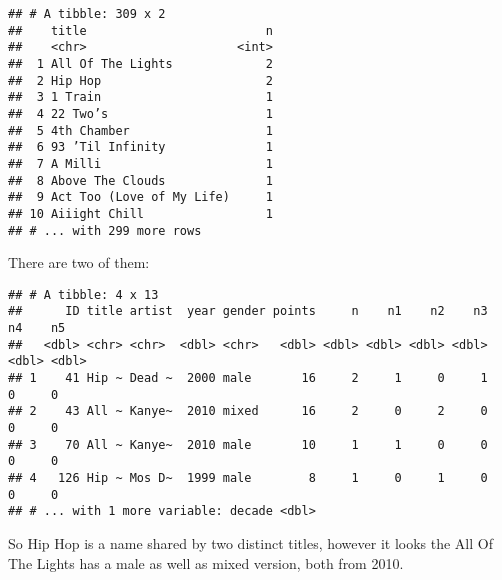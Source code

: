 \documentclass[
]{article}
\newenvironment{Shaded}{\begin{snugshade}}{\end{snugshade}}
\newcommand{\DataTypeTok}[1]{\textcolor[rgb]{0.13,0.29,0.53}{#1}}
\newcommand{\KeywordTok}[1]{\textcolor[rgb]{0.13,0.29,0.53}{\textbf{#1}}}
\newcommand{\NormalTok}[1]{#1}
\newcommand{\OperatorTok}[1]{\textcolor[rgb]{0.81,0.36,0.00}{\textbf{#1}}}
\newcommand{\StringTok}[1]{\textcolor[rgb]{0.31,0.60,0.02}{#1}}
\begin{document}
\begin{verbatim}
## # A tibble: 309 x 2
##    title                         n
##    <chr>                     <int>
##  1 All Of The Lights             2
##  2 Hip Hop                       2
##  3 1 Train                       1
##  4 22 Two’s                      1
##  5 4th Chamber                   1
##  6 93 ’Til Infinity              1
##  7 A Milli                       1
##  8 Above The Clouds              1
##  9 Act Too (Love of My Life)     1
## 10 Aiiight Chill                 1
## # ... with 299 more rows
\end{verbatim}

There are two of them:

\begin{Shaded}
\end{Shaded}

\begin{verbatim}
## # A tibble: 4 x 13
##      ID title artist  year gender points     n    n1    n2    n3    n4    n5
##   <dbl> <chr> <chr>  <dbl> <chr>   <dbl> <dbl> <dbl> <dbl> <dbl> <dbl> <dbl>
## 1    41 Hip ~ Dead ~  2000 male       16     2     1     0     1     0     0
## 2    43 All ~ Kanye~  2010 mixed      16     2     0     2     0     0     0
## 3    70 All ~ Kanye~  2010 male       10     1     1     0     0     0     0
## 4   126 Hip ~ Mos D~  1999 male        8     1     0     1     0     0     0
## # ... with 1 more variable: decade <dbl>
\end{verbatim}

So Hip Hop is a name shared by two distinct titles, however it looks the
All Of The Lights has a male as well as mixed version, both from 2010.

\begin{Shaded}
\end{Shaded}
\end{document}
